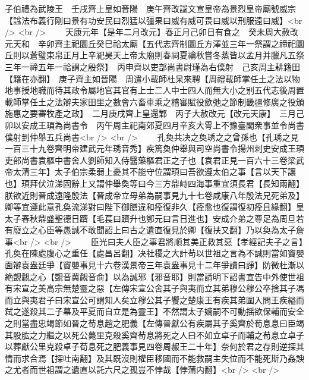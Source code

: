 子伯禮為武陵王　壬戌齊上皇如晉陽　庚午齊改諡文宣皇帝為景烈皇帝廟號威宗【諡法布義行剛曰景有功安民曰烈猛以彊果曰威有威可畏曰威以刑服遠曰威】<br />
<br />
　　天康元年【是年二月改元】春正月己卯日有食之　癸未周大赦改元天和　辛卯齊主祀圜丘癸巳祫太廟【五代志齊制圜丘方澤並三年一祭謂之禘祀圜丘則以蒼璧束帛正月上辛祀昊天上帝太廟則春祠夏禴秋嘗冬蒸皆以孟月并臘凡五祭三年一禘五年一祫謂之殷祭】　丙申齊以吏部尚書尉瑾為右僕射　己亥周主耕籍田【籍在亦翻】　庚子齊主如晉陽　周遣小載師杜杲來聘【周禮載師掌任土之法以物地事授地職而待其政令屬地官其官有上士二人中士四人而無大小之别五代志後周置載師掌任土之法辯夫家田里之數會六畜車乘之稽審賦役歛弛之節制畿疆修廣之役頒施惠之要審牧產之政】　二月庚戌齊上皇還鄴　丙子大赦改元【改元天康】　三月己卯以安成王頊為尚書令　丙午周主祀南郊夏四月辛亥大雩上不豫臺閣衆事並令尚書僕射到仲舉五兵尚書<br />
<br />
　　孔奐共决之奐琇之之曾孫也【孔琇之見一百三十九卷齊明帝建武元年琇音秀】疾篤奐仲舉與司空尚書令揚州刺史安成王頊吏部尚書袁樞中書舍人劉師知入侍醫藥樞君正之子也【袁君正見一百六十三卷梁武帝太清三年】太子伯宗柔弱上憂其不能守位謂頊曰吾欲遵太伯之事【言以天下讓也】頊拜伏泣涕固辭上又謂仲舉奐等曰今三方鼎峙四海事重宜須長君【長知兩翻】朕欲近則晉成遠隆殷法【晉成帝立母弟為嗣事見九十七卷咸康八年殷法兄死弟及】卿等宜遵此意孔奐流涕對曰陛下御膳違和痊復非久【痊愈也復謂復初痊且緣翻】皇太子春秋鼎盛聖德日躋【毛萇曰躋升也鄭元曰言日進也】安成介弟之尊足為周旦若有廢立之心臣等愚誠不敢聞詔上曰古之遺直復見於卿【復扶又翻】乃以奐為太子詹事<br />
<br />
　　臣光曰夫人臣之事君將順其美正救其惡【孝經記夫子之言】孔奐在陳處腹心之重任【處昌呂翻】决社稷之大計苟以世祖之言為不誠則當如竇嬰面辯袁盎廷爭【竇嬰事見十六卷漢景帝三年袁盎事見十二年爭讀曰諍】防微杜漸以絶覬覦之心【覬音冀覦音俞】以為誠邪【邪音耶】則當請明下詔書宣告中外使世祖有宋宣之美高宗無楚靈之惡【左傳宋宣公舍其子與夷而立其弟穆公穆公卒捨其子馮而立與夷君子曰宋宣公可謂知人矣立穆公其子饗之楚康王有疾其弟圍入問王疾縊而弑之遂殺其二子幕及平夏而自立是為靈王】不然謂太子嫡嗣不可動揺欲保輔而安全之則當盡忠竭節如晉之荀息趙之肥義【左傳晉獻公有疾屬其子奚齊於荀息息曰臣竭其股肱之力繼之以死公薨里克殺奚齊荀息將死之人曰不如立卓子而輔之荀息立卓子以葬獻公里克殺卓子荀息死之肥義事見四卷周赧王二十年】奈何於君之存則逆探其情而求合焉【探吐南翻】及其既沒則權臣移國而不能救嗣主失位而不能死斯乃姦諛之尤者而世祖謂之遺直以託六尺之孤豈不悖哉【悖蒲内翻】<br />
<br />
